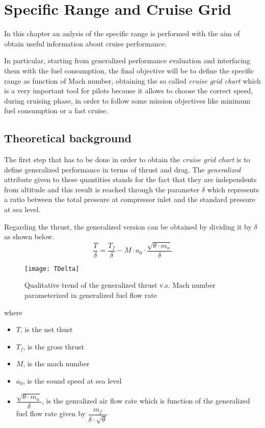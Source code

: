\chapter{Specific Range and Cruise Grid}
In this chapter an anlysis of the specific range is performed with the aim of obtain useful information about cruise performance. 

In particular, starting from generalized performance evaluation and interfacing them with the fuel consumption, the final objective will be to define the specific range as function of Mach number, obtaining the so called \emph{cruise grid chart} which is a very important tool for pilots because it allows to choose the correct speed, during cruising phase, in order to follow some mission objectives like minimum fuel consumption or a fast cruise.

\section{Theoretical background}
The first step that has to be done in order to obtain the \emph{cruise grid chart} is to define generalized performance in terms of thrust and drag. The \emph{generalized} attribute given to these quantities stands for the fact that they are independents from altitude and this result is reached through the parameter $\delta$ which represents a ratio between the total pressure at compressor inlet and  the standard pressure at sea level. 

\bigskip
\noindent
Regarding the thrust, the generalized version can be obtained by dividing it by $\delta$ as shown below.
\begin{equation}
\frac{T}{\delta}=\frac{T_{f}}{\delta}-M\cdot a_{0}\cdot \frac{\sqrt{\theta \cdot m_{a}}}{\delta}
\label{eqn:Equation1}
\end{equation}

\begin{figure}[!ht]
\centering
\texttt{[image: TDelta]}
\caption{Qualitative trend of  the generalized thrust v.s. Mach number parameterized in generalized fuel flow rate}
\label{fig:Figure1}
\end{figure}

where

\begin{itemize}
\item $T$, is the net thust
\item $T_{f}$, is the gross thrust
\item $M$, is the mach number
\item $a_{0}$, is the sound speed at sea level
\item $\dfrac{\sqrt{\theta \cdot m_{a}}}{\delta}$, is the genralized air flow rate which is function of the generalized fuel flow rate given by $\dfrac{m_{f}}{\delta \cdot \sqrt{\theta}}$
\end{itemize}

